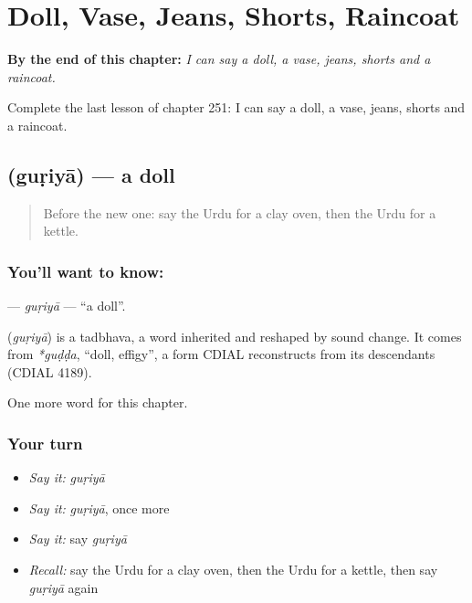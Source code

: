 
\chapter{Doll, Vase, Jeans, Shorts, Raincoat}
\label{ch:ur-doll-vase-jeans-shorts-raincoat}

\begin{chapteropening}
\textbf{By the end of this chapter:} \emph{I can say a doll, a vase, jeans, shorts and a raincoat.}

Complete the last lesson of chapter 251: I can say a doll, a vase, jeans, shorts and a raincoat.
\end{chapteropening}

\section[\texorpdfstring{\ur{گڑیا} (guṛiyā)}{گڑیا (guṛiyā)}]{ (guṛiyā) — a doll}

\label{lesson:UR-C251-guriya}



\begin{quote}
Before the new one: say the Urdu for a clay oven, then the Urdu for a kettle.
\end{quote}

\subsection*{You'll want to know: }
\textbf{} — \emph{guṛiyā} — \textquotedblleft{}a doll\textquotedblright{}.

\begin{cousinweb}
\textbf{} (\emph{guṛiyā}) is a tadbhava, a word inherited and reshaped by sound change. It comes from \emph{*guḍḍa}, \textquotedblleft{}doll, effigy\textquotedblright{}, a form CDIAL reconstructs from its descendants (CDIAL 4189).
\end{cousinweb}

\begin{grammarlens}[title={What you've built}]
One more word for this chapter.
\end{grammarlens}

\subsection*{Your turn}
\begin{itemize}
\raggedright
  \item \emph{Say it:} \emph{guṛiyā}
  \item \emph{Say it:} \emph{guṛiyā}, once more
  \item \emph{Say it:} say \emph{guṛiyā}
  \item \emph{Recall:} say the Urdu for a clay oven, then the Urdu for a kettle, then say \emph{guṛiyā} again
\end{itemize}

